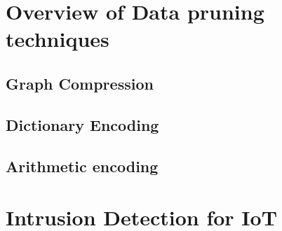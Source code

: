 \section{Overview of Data pruning techniques}

\subsection{Graph Compression}

\subsection{Dictionary Encoding}

\subsection{Arithmetic encoding}


\section{Intrusion Detection for IoT}



